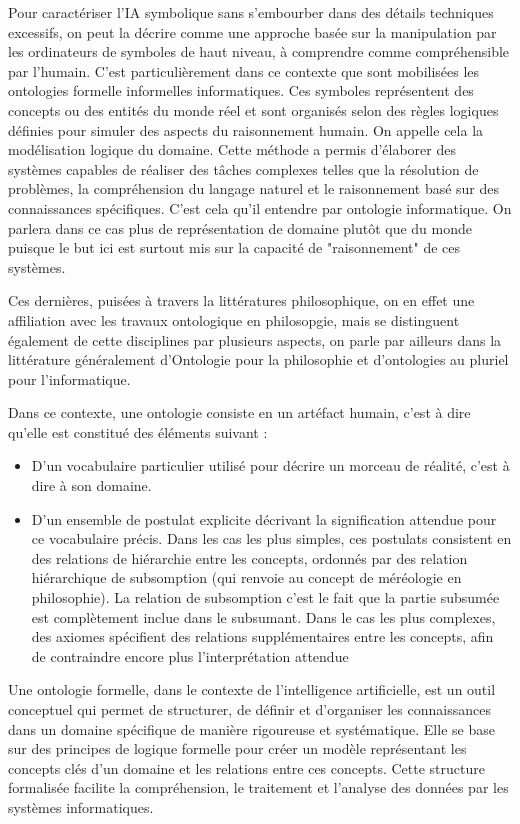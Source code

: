 \documentclass[12pt]{report}
\begin{document}
Pour caractériser l'IA symbolique sans s'embourber dans des détails techniques excessifs, on peut la décrire comme une approche basée sur la manipulation par les ordinateurs de symboles de haut niveau, à comprendre comme compréhensible par l'humain. C'est particulièrement dans ce contexte que sont mobilisées les ontologies formelle informelles informatiques. Ces symboles représentent des concepts ou des entités du monde réel et sont organisés selon des règles logiques définies pour simuler des aspects du raisonnement humain. On appelle cela la modélisation logique du domaine. Cette méthode a permis d'élaborer des systèmes capables de réaliser des tâches complexes telles que la résolution de problèmes, la compréhension du langage naturel et le raisonnement basé sur des connaissances spécifiques. C'est cela qu'il entendre par ontologie informatique. On parlera dans ce cas plus de représentation de domaine plutôt que du monde puisque le but ici est surtout mis sur la capacité de "raisonnement" de ces systèmes.

Ces dernières, puisées à travers la littératures philosophique, on en effet une affiliation avec les travaux ontologique en philosopgie, mais se distinguent également de cette disciplines par plusieurs aspects, on parle par ailleurs dans la littérature généralement d'Ontologie pour la philosophie et d'ontologies au pluriel pour l'informatique. 

Dans ce contexte, une ontologie consiste en un artéfact humain, c'est à dire qu'elle est constitué des éléments suivant :
\begin{itemize}
    \item D'un vocabulaire particulier utilisé pour décrire un morceau de réalité, c'est à dire à son domaine.
    \item D'un ensemble de postulat explicite décrivant la signification attendue pour ce vocabulaire précis. Dans les cas les plus simples, ces postulats consistent en des relations de hiérarchie entre les concepts, ordonnés par des relation hiérarchique de subsomption (qui renvoie au concept de méréologie en philosophie). La relation de subsomption c'est le fait que la partie subsumée est complètement inclue dans le subsumant. Dans le cas les plus complexes, des axiomes spécifient des relations supplémentaires entre les concepts, afin de contraindre encore plus l'interprétation attendue
\end{itemize}

Une ontologie formelle, dans le contexte de l'intelligence artificielle, est un outil conceptuel qui permet de structurer, de définir et d'organiser les connaissances dans un domaine spécifique de manière rigoureuse et systématique. Elle se base sur des principes de logique formelle pour créer un modèle représentant les concepts clés d'un domaine et les relations entre ces concepts. Cette structure formalisée facilite la compréhension, le traitement et l'analyse des données par les systèmes informatiques.
\end{document}
